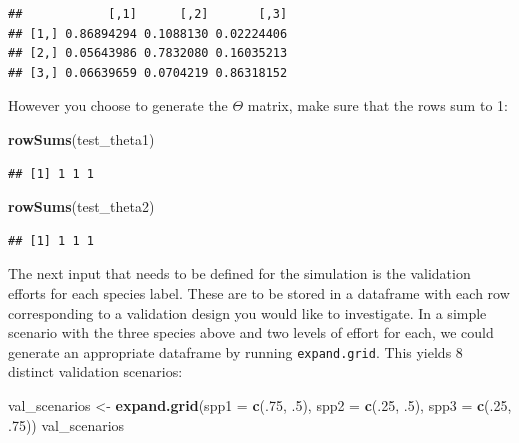 \documentclass[
]{article}
\newenvironment{Shaded}{\begin{snugshade}}{\end{snugshade}}
\newcommand{\AttributeTok}[1]{\textcolor[rgb]{0.13,0.29,0.53}{#1}}
\newcommand{\DecValTok}[1]{\textcolor[rgb]{0.00,0.00,0.81}{#1}}
\newcommand{\FunctionTok}[1]{\textcolor[rgb]{0.13,0.29,0.53}{\textbf{#1}}}
\newcommand{\NormalTok}[1]{#1}
\newcommand{\OtherTok}[1]{\textcolor[rgb]{0.56,0.35,0.01}{#1}}
\begin{document}
\begin{verbatim}
##            [,1]      [,2]       [,3]
## [1,] 0.86894294 0.1088130 0.02224406
## [2,] 0.05643986 0.7832080 0.16035213
## [3,] 0.06639659 0.0704219 0.86318152
\end{verbatim}

\linespread{1}

However you choose to generate the \(\Theta\) matrix, make sure that the rows sum to 1:

\linespread{1}

\begin{Shaded}
\begin{Highlighting}[]
\FunctionTok{rowSums}\NormalTok{(test\_theta1)}
\end{Highlighting}
\end{Shaded}

\begin{verbatim}
## [1] 1 1 1
\end{verbatim}

\begin{Shaded}
\begin{Highlighting}[]
\FunctionTok{rowSums}\NormalTok{(test\_theta2)}
\end{Highlighting}
\end{Shaded}

\begin{verbatim}
## [1] 1 1 1
\end{verbatim}

\linespread{1}

The next input that needs to be defined for the simulation is the validation efforts for each species label. These are to be stored in a dataframe with each row corresponding to a validation design you would like to investigate. In a simple scenario with the three species above and two levels of effort for each, we could generate an appropriate dataframe by running \texttt{expand.grid}. This yields 8 distinct validation scenarios:

\linespread{1}

\begin{Shaded}
\begin{Highlighting}[]
\NormalTok{val\_scenarios }\OtherTok{\textless{}{-}} \FunctionTok{expand.grid}\NormalTok{(}\AttributeTok{spp1 =} \FunctionTok{c}\NormalTok{(.}\DecValTok{75}\NormalTok{, .}\DecValTok{5}\NormalTok{), }\AttributeTok{spp2 =} \FunctionTok{c}\NormalTok{(.}\DecValTok{25}\NormalTok{, .}\DecValTok{5}\NormalTok{), }\AttributeTok{spp3 =} \FunctionTok{c}\NormalTok{(.}\DecValTok{25}\NormalTok{, .}\DecValTok{75}\NormalTok{))}
\NormalTok{val\_scenarios}
\end{Highlighting}
\end{Shaded}
\end{document}

